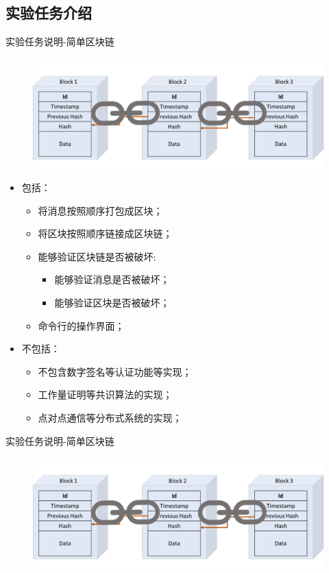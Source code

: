 \documentclass[11pt]{beamer}
\begin{document}
\subsection{实验任务介绍}
\begin{frame}{实验任务说明-简单区块链}
\begin{figure}
	\centering
	\includegraphics[width=0.7\linewidth, height=0.3\textheight]{figures/blockchain}
	\label{fig:blockchain}
\end{figure}
		\scriptsize
	\begin{multicols}{2}
			\begin{itemize}
			\item 包括：
			\begin{itemize}
				\item 将消息按照顺序打包成区块；
				\item 将区块按照顺序链接成区块链；
				\item 能够验证区块链是否被破坏:
				\begin{itemize}
					\item 能够验证消息是否被破坏；
					\item 能够验证区块是否被破坏；
				\end{itemize}
				\item 命令行的操作界面；
			\end{itemize}
			\item 不包括：
			\begin{itemize}
				\item 不包含数字签名等认证功能等实现；
				\item 工作量证明等共识算法的实现；
				\item 点对点通信等分布式系统的实现；
			\end{itemize}
		\end{itemize}
	\end{multicols}
\end{frame}

\begin{frame}{实验任务说明-简单区块链}
	\begin{figure}
		\centering
		\includegraphics[width=0.9\linewidth]{figures/blockchain}
		\label{fig:blockchain}
	\end{figure}
\end{frame}
\end{document}

